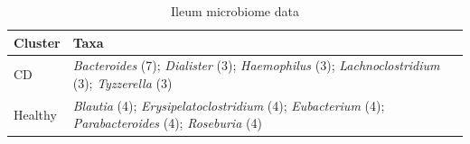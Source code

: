 \begin{table}[ht]
\centering
\caption{Ileum microbiome data}
\label{tab:ileum_taxa}
\begin{tabular}{p{1.2cm}p{12cm}}
\toprule
Cluster & Taxa \\
\midrule
CD & \textit{Bacteroides} (7); \textit{Dialister} (3); \textit{Haemophilus} (3); \textit{Lachnoclostridium} (3); \textit{Tyzzerella} (3) \\
\addlinespace
Healthy & \textit{Blautia} (4); \textit{Erysipelatoclostridium} (4); \textit{Eubacterium} (4); \textit{Parabacteroides} (4); \textit{Roseburia} (4) \\
\bottomrule
\end{tabular}
\end{table}